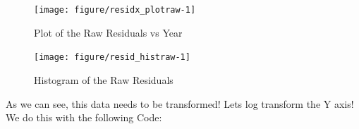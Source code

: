 \documentclass[english]{article}\usepackage[]{graphicx}\usepackage[]{color}
\newenvironment{knitrout}{}{} %
\begin{document}
\begin{figure}[H]
	\begin{center}
	\caption{Plot of the Raw Residuals vs Year}
\begin{knitrout}
\color{fgcolor}
\texttt{[image: figure/residx\_plotraw-1]} 

\end{knitrout}
	\par\end{center}
\end{figure}
\begin{figure}[H]
	\caption{Histogram of the Raw Residuals}
	\begin{center}
\begin{knitrout}
\color{fgcolor}
\texttt{[image: figure/resid\_histraw-1]} 

\end{knitrout}
	\par\end{center}
\end{figure}
As we can see, this data needs to be transformed! Lets log transform the Y axis! We do this with the following Code:
\end{document}
